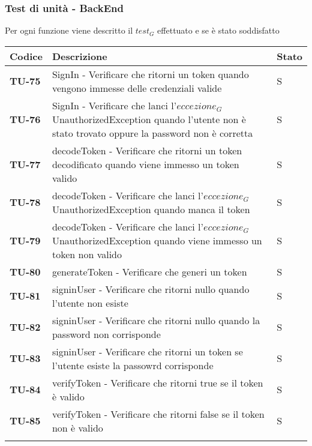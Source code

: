\subsubsection{Test di unità - BackEnd}
Per ogni funzione viene descritto il $\textit{test}_G$ effettuato e se è stato soddisfatto
\begin{longtable}{|>{\centering\arraybackslash}p{2cm}|p{15cm}|p{1cm}|}
  \hline
  \rowcolor{gray!30}
  \textbf{Codice} & \textbf{Descrizione} & \textbf{Stato} \\
  \hline
  \rowcolor{gray!10}
  \textbf{TU-75} & SignIn - Verificare che ritorni un token quando vengono immesse delle credenziali valide & S \\
  \hline
  \rowcolor{gray!10}
  \textbf{TU-76} & SignIn - Verificare che lanci l'$\textit{eccezione}_G$ UnauthorizedException quando l'utente non è stato trovato oppure la password non è corretta  & S \\
  \hline
  \rowcolor{gray!10}
  \textbf{TU-77} & decodeToken - Verificare che ritorni un token decodificato quando viene immesso un token valido  & S \\
  \hline
  \rowcolor{gray!10}
  \textbf{TU-78} & decodeToken - Verificare che lanci l'$\textit{eccezione}_G$ UnauthorizedException quando manca il token   & S \\
  \hline
  \rowcolor{gray!10}
  \textbf{TU-79} & decodeToken - Verificare che lanci l'$\textit{eccezione}_G$ UnauthorizedException quando viene immesso un token non valido   & S \\
  \hline
  \rowcolor{gray!10}
  \textbf{TU-80} & generateToken - Verificare che generi un token   & S \\
  \hline
  \rowcolor{gray!10}
  \textbf{TU-81} & signinUser - Verificare che ritorni nullo quando l'utente non esiste   & S \\
  \hline
  \rowcolor{gray!10}
  \textbf{TU-82} & signinUser - Verificare che ritorni nullo quando la password non corrisponde   & S \\
  \hline
  \rowcolor{gray!10}
  \textbf{TU-83} & signinUser - Verificare che ritorni un token se l'utente esiste la passowrd corrisponde   & S \\
  \hline
  \rowcolor{gray!10}
  \textbf{TU-84} & verifyToken - Verificare che ritorni true se il token è valido   & S \\
  \hline
  \rowcolor{gray!10}
  \textbf{TU-85} & verifyToken - Verificare che ritorni false se il token non è valido   & S \\
  \hline
  \rowcolor{gray!10}

\end{longtable}
